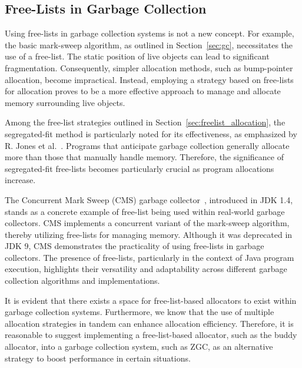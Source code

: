 \subsection{Free-Lists in Garbage Collection}

Using free-lists in garbage collection systems is not a new concept. For example, the basic mark-sweep algorithm, as outlined in Section~\ref{sec:gc}, necessitates the use of a free-list. The static position of live objects can lead to significant fragmentation. Consequently, simpler allocation methods, such as bump-pointer allocation, become impractical. Instead, employing a strategy based on free-lists for allocation proves to be a more effective approach to manage and allocate memory surrounding live objects.

Among the free-list strategies outlined in Section~\ref{sec:freelist_allocation}, the segregated-fit method is particularly noted for its effectiveness, as emphasized by R. Jones et al.~\cite{gchandbook}. Programs that anticipate garbage collection generally allocate more than those that manually handle memory. Therefore, the significance of segregated-fit free-lists becomes particularly crucial as program allocations increase.

The Concurrent Mark Sweep (CMS) garbage collector~\cite{cms}, introduced in JDK 1.4, stands as a concrete example of free-list being used within real-world garbage collectors. CMS implements a concurrent variant of the mark-sweep algorithm, thereby utilizing free-lists for managing memory. Although it was deprecated in JDK 9, CMS demonstrates the practicality of using free-lists in garbage collectors. The presence of free-lists, particularly in the context of Java program execution, highlights their versatility and adaptability across different garbage collection algorithms and implementations.

It is evident that there exists a space for free-list-based allocators to exist within garbage collection systems. Furthermore, we know that the use of multiple allocation strategies in tandem can enhance allocation efficiency. Therefore, it is reasonable to suggest implementing a free-list-based allocator, such as the buddy allocator, into a garbage collection system, such as ZGC, as an alternative strategy to boost performance in certain situations.

